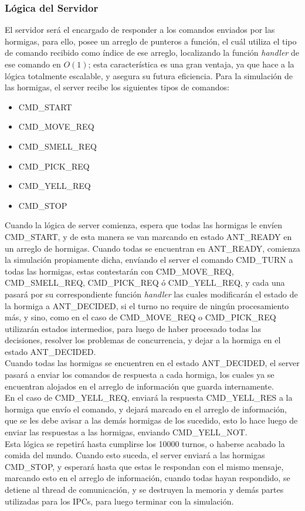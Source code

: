 \documentclass[a4paper,10pt]{article}
\begin{document}
\subsubsection{Lógica del Servidor}
El servidor será el encargado de responder a los comandos enviados por las hormigas, para ello, posee un arreglo de punteros a función, el cuál utiliza
el tipo de comando recibido como índice de ese arreglo, localizando la función \textit{handler} de ese comando en \textbf{$O(1)$}; esta característica es
una gran ventaja, ya que hace a la lógica totalmente escalable, y asegura su futura eficiencia.
Para la simulación de las hormigas, el server recibe los siguientes tipos de comandos:
\begin{itemize}
 \item CMD\_START
 \item CMD\_MOVE\_REQ
 \item CMD\_SMELL\_REQ
 \item CMD\_PICK\_REQ
 \item CMD\_YELL\_REQ
 \item CMD\_STOP
\end{itemize}
Cuando la lógica de server comienza, espera que todas las hormigas le envíen CMD\_START, y de esta manera se van marcando en estado ANT\_READY 
en un arreglo de hormigas.
Cuando todas se encuentran en ANT\_READY, comienza la simulación propiamente dicha, envíando el server el comando CMD\_TURN a todas las hormigas,
estas contestarán con CMD\_MOVE\_REQ, CMD\_SMELL\_REQ, CMD\_PICK\_REQ ó CMD\_YELL\_REQ, y cada una pasará por su correspondiente función 
\textit{handler} las cuales modificarán el estado de la hormiga a ANT\_DECIDED, si el turno no require de ningún procesamiento más, y sino, como en el
caso de CMD\_MOVE\_REQ o CMD\_PICK\_REQ utilizarán estados intermedios, para luego de haber procesado todas las decisiones, resolver los problemas
de concurrencia, y dejar a la hormiga en el estado ANT\_DECIDED.\\
Cuando todas las hormigas se encuentren en el estado ANT\_DECIDED, el server pasará a enviar los comandos de respuesta a cada hormiga, los cuales
ya se encuentran alojados en el arreglo de información que guarda internamente.\\
En el caso de CMD\_YELL\_REQ, enviará la respuesta CMD\_YELL\_RES a la hormiga que envío el comando, y dejará marcado en el arreglo de información, que
se les debe avisar a las demás hormigas de los sucedido, esto lo hace luego de enviar las respuestas a las hormigas, enviando CMD\_YELL\_NOT.\\
Esta lógica se repetirá hasta cumplirse los 10000 turnos, o haberse acabado la comida del mundo. Cuando esto suceda, el server enviará a las hormigas
CMD\_STOP, y esperará hasta que estas le respondan con el mismo mensaje, marcando esto en el arreglo de información, cuando todas hayan respondido,
se detiene al thread de comunicación, y se destruyen la memoria y demás partes utilizadas para los IPCs, para luego terminar con la simulación.
\end{document}

